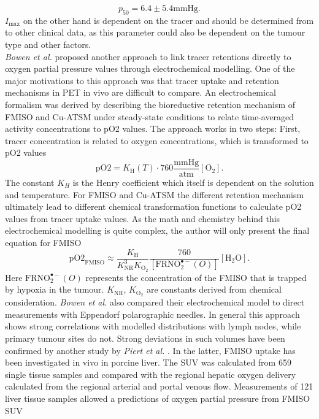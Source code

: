 \begin{equation}
p_\mathrm{50} = 6.4 \pm 5.4 \mathrm{mmHg}.
\end{equation}
$I_\mathrm{max}$ on the other hand is dependent on the tracer and should be determined from to other clinical data, as this parameter could also be dependent on the tumour type and other factors.\\\textit{Bowen et al.} \cite{pmid21843774} proposed another approach to link tracer retentions directly to oxygen partial pressure values through electrochemical modelling. One of the major motivations to this approach was that tracer uptake and retention mechanisms in PET in vivo are difficult to compare. An electrochemical formalism was derived by describing the bioreductive retention mechanism of FMISO and Cu-ATSM under steady-state conditions to relate time-averaged activity concentrations to pO2 values. The approach works in two steps: First, tracer concentration is related to oxygen concentrations, which is transformed to pO2 values
\begin{equation}
\mathrm{pO2} = K_\mathrm{H}(T)\cdot 760 \frac{\mathrm{mmHg}}{\mathrm{atm}}[\mathrm{O}_2].
\end{equation}
The constant $K_H$ is the Henry coefficient which itself is dependent on the solution and temperature.  For FMISO and Cu-ATSM the different retention mechanism ultimately lead to different chemical transformation functions to calculate pO2 values from tracer uptake values. As the math and chemistry behind this electrochemical modelling is quite complex, the author will only present the final equation for FMISO
\begin{equation}
\mathrm{pO2}_\mathrm{FMISO} \approx \frac{K_\mathrm{H}}{K_\mathrm{NR}^3K_{\mathrm{O}_2}}\frac{760}{[\mathrm{FRNO}_2^{\bullet -}(O)]}[\mathrm{H}_2\mathrm{O}].
\end{equation}
Here $\mathrm{FRNO}_2^{\bullet -}(O)$ represents the concentration of the FMISO that is trapped by hypoxia in the tumour. $K_\mathrm{NR}$, $K_{\mathrm{O}_2}$ are constants derived from chemical consideration. \textit{Bowen et al.} also compared their electrochemical model to direct measurements with Eppendorf polarographic needles. In general this approach shows strong correlations with modelled distributions with lymph nodes, while primary tumour sites do not. Strong deviations in such volumes have been confirmed by another study by \textit{Piert et al.} \cite{pmid11150699}. In the latter, FMISO uptake has been investigated in vivo in porcine liver. The SUV was calculated from 659 single tissue samples and compared with the regional hepatic oxygen delivery calculated from the regional arterial and portal venous flow. Measurements of 121 liver tissue samples allowed a predictions of oxygen partial pressure from FMISO SUV
